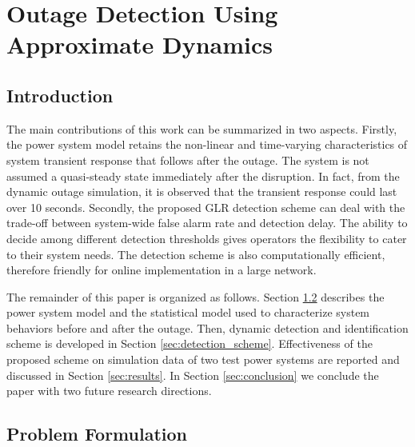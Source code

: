 
\chapter{Outage Detection Using Approximate Dynamics}
\label{ch:detection_using_approximate_dynamics}
\vspace{2em}

\section{Introduction} %
\label{sec:introduction}

The main contributions of this work can be summarized in two aspects. Firstly, the power system model retains the non-linear and time-varying characteristics of system transient response that follows after the outage. The system is not assumed a quasi-steady state immediately after the disruption. In fact, from the dynamic outage simulation, it is observed that the transient response could last over 10 seconds. Secondly, the proposed GLR detection scheme can deal with the trade-off between system-wide false alarm rate and detection delay. The ability to decide among different detection thresholds gives operators the flexibility to cater to their system needs. The detection scheme is also computationally efficient, therefore friendly for online implementation in a large network.


The remainder of this paper is organized as follows. Section \ref{sec:formulation} describes the power system model and the statistical model used to characterize system behaviors before and after the outage. Then, dynamic detection and identification scheme is developed in Section \ref{sec:detection_scheme}. Effectiveness of the proposed scheme on simulation data of two test power systems are reported and discussed in Section \ref{sec:results}. In Section \ref{sec:conclusion} we conclude the paper with two future research directions.


\section{Problem Formulation}
\label{sec:formulation}

